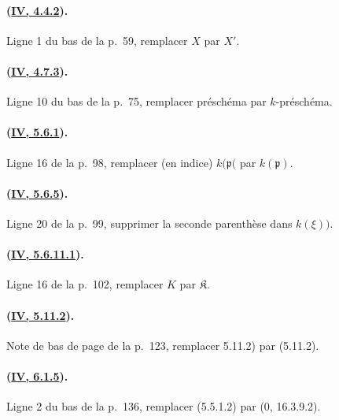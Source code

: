 \paragraph{({\texorpdfstring{\protect\hyperref[canon-index.ega4.c04.lem.4-4-2]{IV, 4.4.2}}{IV, 4.4.2}}).}
Ligne 1 du bas de la p.~59, remplacer $X$ par $X'$.

\paragraph{({\texorpdfstring{\protect\hyperref[canon-index.ega4.c04.prop.4-7-3]{IV, 4.7.3}}{IV, 4.7.3}}).}
Ligne 10 du bas de la p.~75, remplacer préschéma par $k$-préschéma.

\paragraph{({\texorpdfstring{\protect\hyperref[canon-index.ega4.c04.prop.5-6-1]{IV, 5.6.1}}{IV, 5.6.1}}).}
Ligne 16 de la p.~98, remplacer (en indice) $k(\mathfrak p($ par
$k(\mathfrak p)$.

\paragraph{({\texorpdfstring{\protect\hyperref[canon-index.ega4.c04.prop.5-6-5]{IV, 5.6.5}}{IV, 5.6.5}}).}
Ligne 20 de la p.~99, supprimer la seconde parenthèse dans $k(\xi))$.

\paragraph{({\texorpdfstring{\protect\hyperref[canon-index.ega4.c04.lem.5-6-11-1]{IV, 5.6.11.1}}{IV, 5.6.11.1}}).}
Ligne 16 de la p.~102, remplacer $K$ par $\mathfrak K$.

\paragraph{({\texorpdfstring{\protect\hyperref[canon-index.ega4.c04.cor.5-11-2]{IV, 5.11.2}}{IV, 5.11.2}}).}
Note de bas de page de la p.~123, remplacer 5.11.2) par (5.11.2).

\paragraph{({\texorpdfstring{\protect\hyperref[canon-index.ega4.c04.prop.6-1-5]{IV, 6.1.5}}{IV, 6.1.5}}).}
Ligne 2 du bas de la p.~136, remplacer (5.5.1.2) par
($0$, 16.3.9.2).

